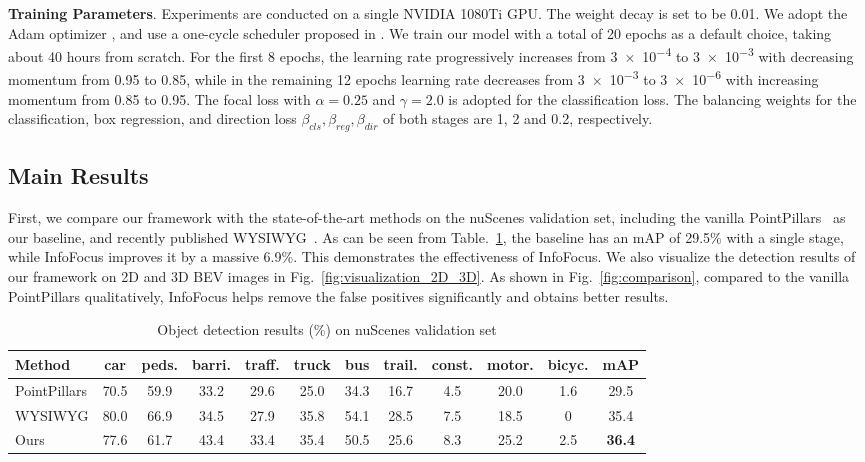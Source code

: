 \documentclass[runningheads]{llncs}
\begin{document}
\noindent\textbf{Training Parameters}.
Experiments are conducted on a single NVIDIA 1080Ti GPU. The weight decay is set to be 0.01. We adopt the Adam optimizer \cite{kingma2014adam}, and use a one-cycle scheduler proposed in \cite{smith2018disciplined}. We train our model with a total of 20 epochs as a default choice, taking about 40 hours from scratch. For the first 8 epochs, the learning rate progressively increases from \num{3e-4} to \num{3e-3} with decreasing momentum from 0.95 to 0.85, while in the remaining 12 epochs learning rate decreases from \num{3e-3} to \num{3e-6} with increasing momentum from 0.85 to 0.95. The focal loss \cite{lin2017focal} with $ \alpha = 0.25 $ and $ \gamma = 2.0 $  is adopted for the classification loss. The balancing weights for the classification, box regression, and direction loss \(  \beta_{cls}, \beta_{reg}, \beta_{dir} \) of both stages are 1, 2 and 0.2, respectively.

\subsection{Main Results}
 First, we compare our framework with the state-of-the-art methods on the nuScenes validation set, including the vanilla PointPillars~\cite{lang2019PointPillars} as our baseline, and recently published WYSIWYG~\cite{hu2019you}. As can be seen from Table.~\ref{table:1}, the baseline has an mAP of 29.5\% with a single stage, while InfoFocus improves it by a massive 6.9\%. This demonstrates the effectiveness of InfoFocus. We also visualize the detection results of our framework on 2D and 3D BEV images in Fig.~\ref{fig:visualization_2D_3D}. As shown in Fig.~\ref{fig:comparison}, compared to the vanilla PointPillars qualitatively, InfoFocus helps remove the false positives significantly and obtains better results. 
 
  \begin{table}[h!]
\centering
\caption{Object detection results (\%) on nuScenes validation set}
\begin{tabular}{l c c c c c c c c c c c} 
 \hline
 Method & car & peds. & barri. & traff. & truck & bus & trail. & const. & motor. & bicyc. & mAP \\ [0.5ex] 
 \hline
  PointPillars \cite{lang2019PointPillars} & 70.5 & 59.9 & 33.2 & 29.6 & 25.0 & 34.3 & 16.7 & 4.5 & 20.0 & 1.6 & 29.5 \\

    WYSIWYG \cite{hu2019you} & 80.0 & 66.9 & 34.5 & 27.9 & 35.8 & 54.1 & 28.5 & 7.5 & 18.5 & 0 & 35.4 \\
  \hline
  Ours & 77.6 & 61.7 & 43.4 & 33.4 & 35.4 & 50.5 & 25.6 & 8.3 & 25.2 & 2.5 & \bf 36.4 \\
\hline
\end{tabular}
\label{table:1}
\end{table}
\end{document}
